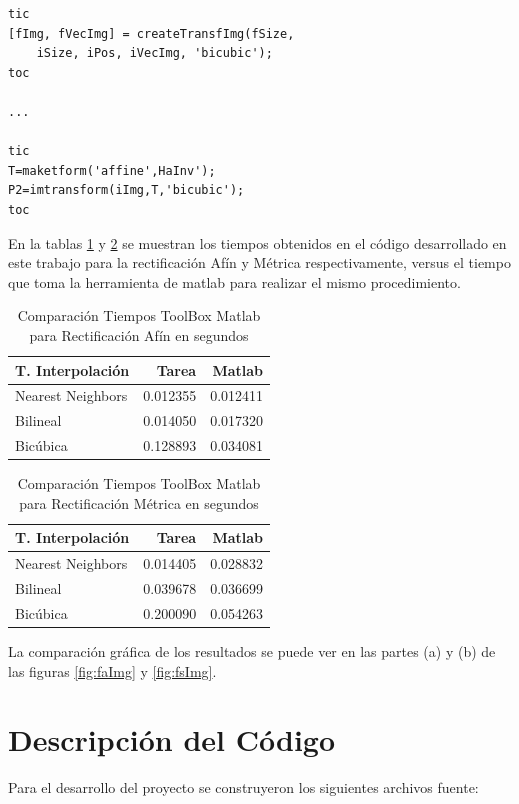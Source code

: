 \documentclass{IEEEtran}
\begin{document}
\begin{lstlisting}[frame=single]
tic
[fImg, fVecImg] = createTransfImg(fSize, 
	iSize, iPos, iVecImg, 'bicubic');
toc

...

tic
T=maketform('affine',HaInv');
P2=imtransform(iImg,T,'bicubic');
toc
\end{lstlisting}

En la tablas \ref{tb:timeA} y \ref{tb:timeM} se muestran los tiempos obtenidos
en el código desarrollado en este trabajo para la rectificación Afín y Métrica
respectivamente, versus el tiempo que toma la herramienta
de matlab para realizar el mismo procedimiento.

\begin{table}
\centering
\begin{tabular}{|l|r|r|}
\hline
T. Interpolación & Tarea & Matlab \\ 
\hline
Nearest Neighbors & 0.012355 & 0.012411 \\
Bilineal & 0.014050 & 0.017320 \\
Bicúbica & 0.128893 & 0.034081 \\
\hline
\end{tabular}
\caption{Comparación Tiempos ToolBox Matlab para Rectificación Afín en segundos}
\label{tb:timeA}
\end{table} 

\begin{table}
\centering
\begin{tabular}{|l|r|r|}
\hline
T. Interpolación & Tarea & Matlab \\ 
\hline
Nearest Neighbors & 0.014405  &0.028832  \\
Bilineal &0.039678  & 0.036699 \\
Bicúbica & 0.200090 & 0.054263 \\
\hline
\end{tabular}
\caption{Comparación Tiempos ToolBox Matlab para Rectificación Métrica en segundos}
\label{tb:timeM}
\end{table} 

La comparación gráfica de los resultados se puede ver en las partes (a) y (b) de las
figuras \ref{fig:faImg} y \ref{fig:fsImg}.

\section{Descripción del Código}
Para el desarrollo del proyecto se construyeron
los siguientes archivos fuente:
\end{document}
